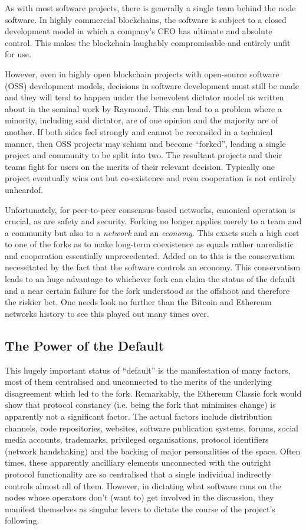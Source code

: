 \documentclass[9pt,oneside]{amsart}
\makeatletter
\newcommand*\ie{i.e.\@\xspace}
\makeatother
\begin{document}
As with most software projects, there is generally a single team behind the node software. In highly commercial blockchains, the software is subject to a closed development model in which a company's CEO has ultimate and absolute control. This makes the blockchain laughably compromisable and entirely unfit for use.

However, even in highly open blockchain projects with open-source software (OSS) development models, decisions in software development must still be made and they will tend to happen under the benevolent dictator model as written about in the seminal work by Raymond\cite{cathedral_and_bazaar}. This can lead to a problem where a minority, including said dictator, are of one opinion and the majority are of another. If both sides feel strongly and cannot be reconsiled in a technical manner, then OSS projects may schism and become ``forked'', leading a single project and community to be split into two. The resultant projects and their teams fight for users on the merits of their relevant decision. Typically one project eventually wins out but co-existence and even cooperation is not entirely unheardof.

Unfortunately, for peer-to-peer consensus-based networks, canonical operation is crucial, as are safety and security. Forking no longer applies merely to a team and a community but also to a \emph{network} and an \emph{economy}. This exacts such a high cost to one of the forks as to make long-term coexistence as equals rather unrealistic and cooperation essentially unprecedented. Added on to this is the conservatism necessitated by the fact that the software controls an economy. This conservatism leads to an huge advantage to whichever fork can claim the status of the default and a near certain failure for the fork understood as the offshoot and therefore the riskier bet. One needs look no further than the Bitcoin and Ethereum networks history to see this played out many times over.

\subsection{The Power of the Default}

This hugely important status of ``default'' is the manifestation of many factors, most of them centralised and unconnected to the merits of the underlying disagreement which led to the fork. Remarkably, the Ethereum Classic fork would show that protocol constancy (\ie being the fork that minimises change) is apparently not a significant factor. The actual factors include distribution channels, code repositories, websites, software publication systems, forums, social media accounts, trademarks, privileged organisations, protocol identifiers (network handshaking) and the backing of major personalities of the space. Often times, these apparently ancilliary elements unconnected with the outright protocol functionality are so centralised that a single individual indirectly controls almost all of them. However, in dictating what software runs on the nodes whose operators don't (want to) get involved in the discussion, they manifest themselves as singular levers to dictate the course of the project's following.
\end{document}
